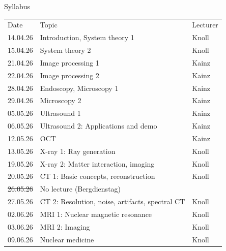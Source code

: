 \begin{frame}[c]{Syllabus}
\small{
\begin{table}[]
\begin{tabular}{rll}
\multicolumn{1}{l}{Date} & \multicolumn{1}{l}{Topic}   			   	& \multicolumn{1}{c}{Lecturer} \\
14.04.26                 & Introduction, System theory 1				&                Knoll      \\
15.04.26                 & System theory 2           		    			&                Knoll      \\
21.04.26                 & Image processing 1   		         		&                 Kainz     \\
22.04.26                 & Image processing 2				 		&                 Kainz     \\
28.04.26                 & Endoscopy, Microscopy 1			       		&                 Kainz     \\
29.04.26                 & Microscopy 2		     			  		&                 Kainz     \\
05.05.26                 & Ultrasound 1	                					&                 Kainz     \\
06.05.26                 & Ultrasound 2: Applications and demo		&                 Kainz     \\
12.05.26                 & OCT									&                 Kainz     \\
13.05.26                 & X-ray 1: Ray generation					&                 Knoll     \\
19.05.26                 & X-ray 2: Matter interaction, imaging 			&                 Knoll     \\
20.05.26                 & CT 1: Basic concepts, reconstruction		&                 Knoll     \\
\st{26.05.26}           & No lecture (Bergdienstag)					&                     \\
27.05.26                 & CT 2: Resolution, noise, artifacts, spectral CT	&                 Knoll     \\
02.06.26                 & MRI 1: Nuclear magnetic resonance 		&  		Knoll	\\
03.06.26                 & MRI 2: Imaging							&		Knoll	\\
09.06.26                 & Nuclear medicine						&	Knoll
\end{tabular}
\end{table}
}
\end{frame}

